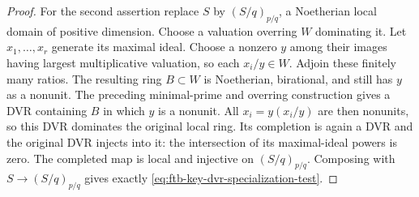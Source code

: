 \begin{proof}
For the second assertion replace \(S\) by
\((S/q)_{p/q}\), a Noetherian local domain of positive
dimension.  Choose a valuation overring \(W\) dominating
it.  Let \(x_1,\ldots,x_r\) generate its maximal ideal.
Choose a nonzero \(y\) among their images having largest
multiplicative valuation, so each \(x_i/y\in W\).
Adjoin these finitely many ratios.
The resulting ring \(B\subset W\) is Noetherian,
birational, and still has \(y\) as a nonunit.
The preceding minimal-prime and overring construction
gives a DVR containing \(B\) in which \(y\) is a nonunit.
All \(x_i=y(x_i/y)\) are then nonunits, so this DVR
dominates the original local ring.
Its completion is again a DVR and the original DVR
injects into it: the intersection of its maximal-ideal
powers is zero.
The completed map is local and injective on
\((S/q)_{p/q}\).
Composing with \(S\to(S/q)_{p/q}\) gives exactly
\eqref{eq:ftb-key-dvr-specialization-test}.
\end{proof}

